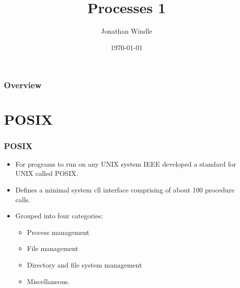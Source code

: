 \documentclass{beamer}
\title[Processes 1]{Processes 1} %
\author{Jonathan Windle} %
\institute[UEA] %
{
University of East Anglia \\ %
\medskip
\textit{J.Windle@uea.ac.uk} %
}
\date{\today} %
\begin{document}
\begin{frame}
\titlepage %
\end{frame}

\begin{frame}[allowframebreaks]
\frametitle{Overview} %
\tableofcontents %
\end{frame}

\section{POSIX}
\begin{frame}
\frametitle{POSIX}
\begin{itemize}
\item For programs to run on any UNIX system IEEE developed a standard for UNIX called POSIX.
\item Defines a minimal system cll interface comprising of about 100 procedure calls.
\item Grouped into four categories:
\begin{itemize}
\item Process management
\item File management
\item Directory and file system management
\item Miscellaneous.
\end{itemize}
\end{itemize}
\end{frame}
\end{document}
